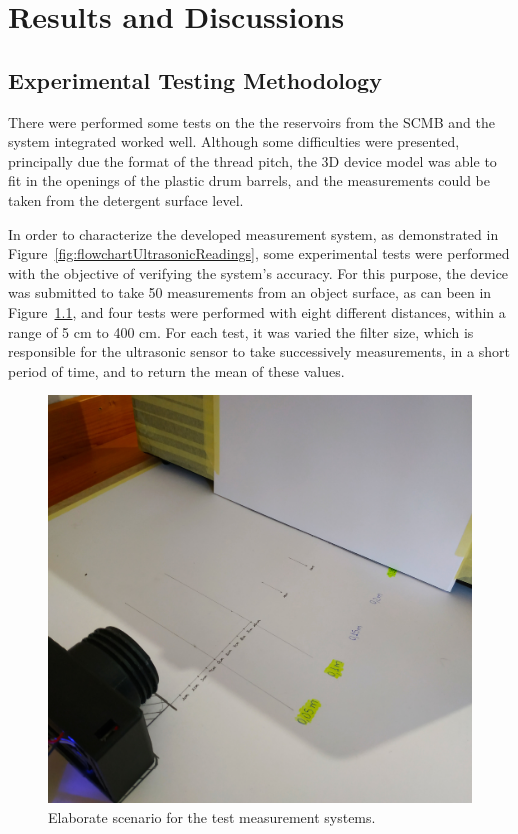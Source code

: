 \chapter{Results and Discussions}\label{cap:results}


\section{Experimental Testing Methodology}\label{section:testingMethodology}

There were performed some tests on the the reservoirs from the \gls{SCMB} and the system integrated worked well. Although some difficulties were presented, principally due the format of the thread pitch, the 3D device model was able to fit in the openings of the plastic drum barrels, and the measurements could be taken from the detergent surface level.

In order to characterize the developed measurement system, as demonstrated in Figure~\ref{fig:flowchartUltrasonicReadings}, some experimental tests were performed with the objective of verifying the system's accuracy. For this purpose, the device was submitted to take 50 measurements from an object surface, as can been in Figure~\ref{fig:measurementTesting}, and four tests were performed with eight different distances, within a range of 5 cm to 400 cm. For each test, it was varied the filter size, which is responsible for the ultrasonic sensor to take successively measurements, in a short period of time, and to return the mean of these values.

\begin{figure}[h!]
    \centering
    \includegraphics[scale=0.075]{images/Results/testing_methodology/3Dtesting.jpg}
    \caption{Elaborate scenario for the test measurement systems.}
    \label{fig:measurementTesting}
\end{figure}

